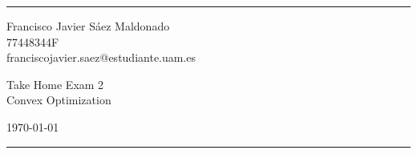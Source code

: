 \documentclass[a4paper]{article}
\begin{document}

\fancyhead[C]{}
\hrule \medskip %
\begin{minipage}{0.295\textwidth}
\raggedright
\footnotesize
Francisco Javier Sáez Maldonado \hfill\\
77448344F \hfill\\
franciscojavier.saez@estudiante.uam.es
\end{minipage}
\begin{minipage}{0.4\textwidth}
\centering
\large
Take Home Exam 2\\
\normalsize
Convex Optimization\\
\end{minipage}
\begin{minipage}{0.295\textwidth}
\raggedleft
\today\hfill\\
\end{minipage}
\medskip\hrule
\bigskip

\end{document}
